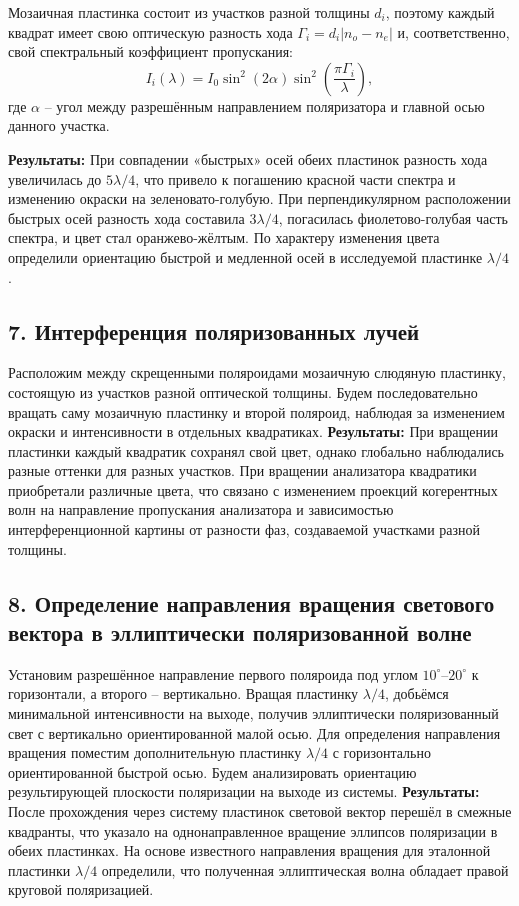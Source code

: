 \documentclass[a4paper]{article}
\begin{document}
Мозаичная пластинка состоит из участков разной толщины $d_i$, поэтому каждый квадрат имеет свою оптическую разность хода $\Gamma_i = d_i |n_o - n_e|$ и, соответственно, свой спектральный коэффициент пропускания:
\begin{equation}
	I_i(\lambda) = I_0 \sin^2(2\alpha)\sin^2(\frac{\pi \Gamma_i}{\lambda}),
\end{equation}
где $\alpha$ – угол между разрешённым направлением поляризатора и главной осью данного участка.

\textbf{Результаты:} При совпадении «быстрых» осей обеих пластинок разность хода увеличилась до $5\lambda/4$, что привело к погашению красной части спектра и изменению окраски на зеленовато-голубую. При перпендикулярном расположении быстрых осей разность хода составила $3\lambda/4$, погасилась фиолетово-голубая часть спектра, и цвет стал оранжево-жёлтым. По характеру изменения цвета определили ориентацию быстрой и медленной осей в исследуемой пластинке $\lambda/4$.

\subsection*{7. Интерференция поляризованных лучей}
Расположим между скрещенными поляроидами мозаичную слюдяную пластинку, состоящую из участков разной оптической толщины. Будем последовательно вращать саму мозаичную пластинку и второй поляроид, наблюдая за изменением окраски и интенсивности в отдельных квадратиках.
\textbf{Результаты:} При вращении пластинки каждый квадратик сохранял свой цвет, однако глобально наблюдались разные оттенки для разных участков. При вращении анализатора квадратики приобретали различные цвета, что связано с изменением проекций когерентных волн на направление пропускания анализатора и зависимостью интерференционной картины от разности фаз, создаваемой участками разной толщины.

\subsection*{8. Определение направления вращения светового вектора в эллиптически поляризованной волне}
Установим разрешённое направление первого поляроида под углом $10^\circ$--$20^\circ$ к горизонтали, а второго -- вертикально. Вращая пластинку $\lambda/4$, добьёмся минимальной интенсивности на выходе, получив эллиптически поляризованный свет с вертикально ориентированной малой осью. Для определения направления вращения поместим дополнительную пластинку $\lambda/4$ с горизонтально ориентированной быстрой осью. Будем анализировать ориентацию результирующей плоскости поляризации на выходе из системы.
\textbf{Результаты:} После прохождения через систему пластинок световой вектор перешёл в смежные квадранты, что указало на однонаправленное вращение эллипсов поляризации в обеих пластинках. На основе известного направления вращения для эталонной пластинки $\lambda/4$ определили, что полученная эллиптическая волна обладает правой круговой поляризацией.
\end{document}
